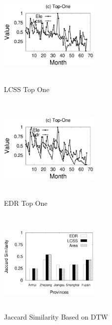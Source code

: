 \begin{figure}
	\centering
	\includegraphics[height=2in, width=1.9in]{lcss-ele}
	\caption{LCSS Top One}
	\label{fig:LCSS}
\end{figure}

\begin{figure}
	\centering
	\includegraphics[height=2in, width=1.9in]{edr-ele}
	\caption{EDR Top One}
	\label{fig:EDR}
\end{figure}

\begin{figure}
	\centering
	\includegraphics[height=2in, width=1.9in]{dtw_jaccard_similarity}
	\caption{Jaccard Similarity Based on DTW}
	\label{fig:Jaccard}
\end{figure}

